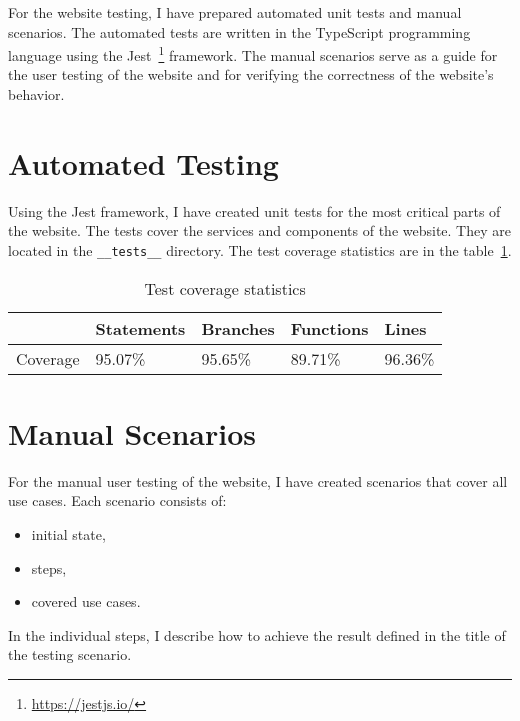 For the website testing, I have prepared automated unit tests and manual scenarios.
The automated tests are written in the TypeScript programming language using the Jest~\footnote{\url{https://jestjs.io/}} framework.
The manual scenarios serve as a guide for the user testing of the website
and for verifying the correctness of the website's behavior.


\section{Automated Testing}
Using the Jest framework, I have created unit tests for the most critical parts of the website.
The tests cover the services and components of the website.
They are located in the \texttt{\_\_tests\_\_} directory.
The test coverage statistics are in the table~\ref{tab:tests-coverage}.

\begin{table}[hbt!]
    \centering
    \captionsetup{justification=centering}
    \begin{tabular}{|l|l|l|l|l|}
        \hline
        ~        & Statements & Branches & Functions & Lines   \\
        \hline
        Coverage & 95.07\%    & 95.65\%  & 89.71\%   & 96.36\% \\
        \hline
    \end{tabular}
    \caption{Test coverage statistics}
    \label{tab:tests-coverage}
\end{table}


\section{Manual Scenarios}
For the manual user testing of the website, I have created scenarios that cover all use cases.
Each scenario consists of:
\begin{itemize}
    \item initial state,
    \item steps,
    \item covered use cases.
\end{itemize}

In the individual steps, I describe how to achieve the result defined in the title of the testing scenario.

\newcommand{\testing}[1]{%
    \stepcounter{testingcounter}%
    \subsection{T\arabic{testingcounter} -- #1}
}


